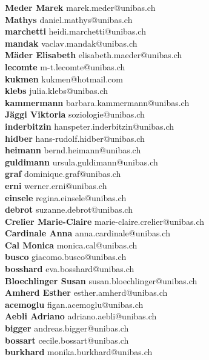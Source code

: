 \documentclass{scrartcl}
\begin{document}
\textbf{Meder Marek } marek.meder@unibas.ch\\
\textbf{Mathys } daniel.mathys@unibas.ch\\
\textbf{marchetti } heidi.marchetti@unibas.ch\\
\textbf{mandak } vaclav.mandak@unibas.ch\\
\textbf{Mäder Elisabeth } elisabeth.maeder@unibas.ch\\
\textbf{lecomte } m-t.lecomte@unibas.ch\\
\textbf{kukmen } kukmen@hotmail.com\\
\textbf{klebs } julia.klebs@unibas.ch\\
\textbf{kammermann } barbara.kammermann@unibas.ch\\
\textbf{Jäggi Viktoria } soziologie@unibas.ch\\
\textbf{inderbitzin } hanspeter.inderbitzin@unibas.ch\\
\textbf{hidber } hans-rudolf.hidber@unibas.ch\\
\textbf{heimann } bernd.heimann@unibas.ch\\
\textbf{guldimann } ursula.guldimann@unibas.ch\\
\textbf{graf } dominique.graf@unibas.ch\\
\textbf{erni } werner.erni@unibas.ch\\
\textbf{einsele } regina.einsele@unibas.ch\\
\textbf{debrot } suzanne.debrot@unibas.ch\\
\textbf{Crelier Marie-Claire } marie-claire.crelier@unibas.ch\\
\textbf{Cardinale Anna } anna.cardinale@unibas.ch\\
\textbf{Cal Monica } monica.cal@unibas.ch\\
\textbf{busco } giacomo.busco@unibas.ch\\
\textbf{bosshard } eva.bosshard@unibas.ch\\
\textbf{Bloechlinger Susan } susan.bloechlinger@unibas.ch\\
\textbf{Amherd Esther } esther.amherd@unibas.ch\\
\textbf{acemoglu } figan.acemoglu@unibas.ch\\
\textbf{Aebli Adriano } adriano.aebli@unibas.ch\\
\textbf{bigger } andreas.bigger@unibas.ch\\
\textbf{bossart } cecile.bossart@unibas.ch\\
\textbf{burkhard } monika.burkhard@unibas.ch\\
\end{document}
